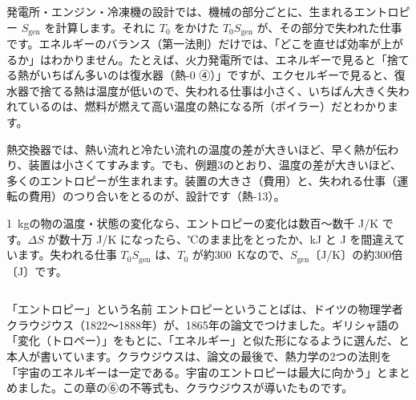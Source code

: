 \begin{phkougaku}[損失がどこで生まれるかを数える]
発電所・エンジン・冷凍機の設計では、機械の部分ごとに、生まれるエントロピー $S_{\mathrm{gen}}$ を計算します。それに $T_0$ をかけた $T_0S_{\mathrm{gen}}$ が、その部分で失われた仕事です。エネルギーのバランス（第一法則）だけでは、「どこを直せば効率が上がるか」はわかりません。たとえば、火力発電所では、エネルギーで見ると「捨てる熱がいちばん多いのは復水器（熱-0 ④）」ですが、エクセルギーで見ると、復水器で捨てる熱は温度が低いので、失われる仕事は小さく、いちばん大きく失われているのは、燃料が燃えて高い温度の熱になる所（ボイラー）だとわかります。

熱交換器では、熱い流れと冷たい流れの温度の差が大きいほど、早く熱が伝わり、装置は小さくてすみます。でも、例題3のとおり、温度の差が大きいほど、多くのエントロピーが生まれます。装置の大きさ（費用）と、失われる仕事（運転の費用）のつり合いをとるのが、設計です（熱-13）。

\begin{phketa}[エントロピーの大きさ]
\qty{1}{kg}の物の温度・状態の変化なら、エントロピーの変化は数百〜数千 J/K です。$\Delta S$ が数十万 J/K になったら、℃のまま比をとったか、kJ と J を間違えています。失われる仕事 $T_0S_{\mathrm{gen}}$ は、$T_0$ が約\qty{300}{K}なので、$S_{\mathrm{gen}}$〔J/K〕の約300倍〔J〕です。
\end{phketa}
\end{phkougaku}

\begin{column}{「エントロピー」という名前}
エントロピーということばは、ドイツの物理学者クラウジウス（1822〜1888年）が、1865年の論文でつけました。ギリシャ語の「変化（トロペー）」をもとに、「エネルギー」と似た形になるように選んだ、と本人が書いています。クラウジウスは、論文の最後で、熱力学の2つの法則を「宇宙のエネルギーは一定である。宇宙のエントロピーは最大に向かう」とまとめました。この章の⑥の不等式も、クラウジウスが導いたものです。
\end{column}

